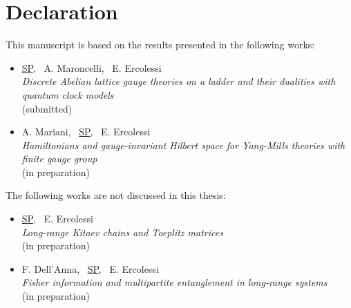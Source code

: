 \chapter*{Declaration}


This manuscript is based on the results presented in the following works:

\begin{itemize}
    \frenchspacing
    \item
        \underline{SP}, ~A. Maroncelli, ~E. Ercolessi\\
        \emph{Discrete Abelian lattice gauge theories on a ladder and their dualities with quantum clock models}\\
         (submitted)

    \item
        A. Mariani, ~\underline{SP}, ~E. Ercolessi\\
        \emph{Hamiltonians and gauge-invariant Hilbert space for Yang-Mills theories with finite gauge group }\\
        (in preparation)
    \nonfrenchspacing
\end{itemize}

\vspace*{1cm}

\noindent The following works are not discussed in this thesis:

\begin{itemize}
    \frenchspacing
    \item
        \underline{SP}, ~E. Ercolessi\\
        \emph{Long-range Kitaev chains and Toeplitz matrices} \\
        (in preparation)

    \item
        F. Dell'Anna, ~\underline{SP}, ~E. Ercolessi\\
        \emph{Fisher information and multipartite entanglement in long-range systems}\\
        (in preparation)

    \nonfrenchspacing
\end{itemize}

\cleardoublepage
